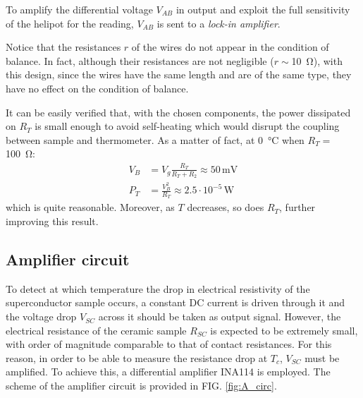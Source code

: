 \documentclass[rmp,10pt,onecolumn,fleqn,notitlepage]{revtex4-1}
\begin{document}
To amplify the differential voltage $V_{AB}$ in output and exploit the full sensitivity of the helipot for the reading, $V_{AB}$ is sent to a \textit{lock-in amplifier}.

Notice that the resistances $r$ of the wires do not appear in the condition of balance. In fact, although their resistances are not negligible ($r \sim $\SI{10}{\ohm}), with this design, since the wires have the same length and are of the same type, they have no effect on the condition of balance. 

It can be easily verified that, with the chosen components, the power dissipated on $R_T$ is small enough to avoid self-heating which would disrupt the coupling between sample and thermometer. As a matter of fact, at \SI{0}{\celsius} when $R_T=$\SI{100}{\ohm}: 
\begin{subequations}
\begin{align}
   V_B & = V_g \frac{R_T}{R_T+R_2} \approx 50 \, \si{\milli\volt}\\
    P_T & = \frac{V_{B}^{2}}{R_{T}} \approx 2.5 \cdot 10^{-5} \, \si{\watt}
\end{align}
\end{subequations}
which is quite reasonable. Moreover, as $T$ decreases, so does $R_T$, further improving this result.

\pagebreak

\subsection{Amplifier circuit}
\label{subsec:amplifier_circuit}
To detect at which temperature the drop in electrical resistivity of the superconductor sample occurs, a constant DC current is driven through it and the voltage drop $V_{SC}$ across it should be taken as output signal. However, the electrical resistance of the ceramic sample $R_{SC}$ is expected to be extremely small, with order of magnitude comparable to that of contact resistances. For this reason, in order to be able to measure the resistance drop at $T_c$, $V_{SC}$ must be amplified. To achieve this, a differential amplifier INA114 is employed. 
The scheme of the amplifier circuit is provided in FIG. \ref{fig:A_circ}.
\end{document}
